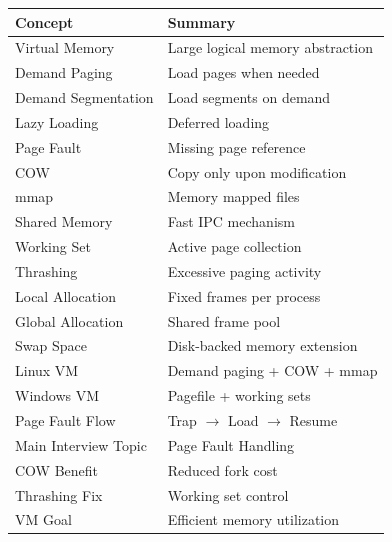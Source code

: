 \begin{longtable}{|p{5cm}|p{8cm}|}
\hline
Concept & Summary \\
\hline
Virtual Memory & Large logical memory abstraction \\
\hline
Demand Paging & Load pages when needed \\
\hline
Demand Segmentation & Load segments on demand \\
\hline
Lazy Loading & Deferred loading \\
\hline
Page Fault & Missing page reference \\
\hline
COW & Copy only upon modification \\
\hline
mmap & Memory mapped files \\
\hline
Shared Memory & Fast IPC mechanism \\
\hline
Working Set & Active page collection \\
\hline
Thrashing & Excessive paging activity \\
\hline
Local Allocation & Fixed frames per process \\
\hline
Global Allocation & Shared frame pool \\
\hline
Swap Space & Disk-backed memory extension \\
\hline
Linux VM & Demand paging + COW + mmap \\
\hline
Windows VM & Pagefile + working sets \\
\hline
Page Fault Flow & Trap $\rightarrow$ Load $\rightarrow$ Resume \\
\hline
Main Interview Topic & Page Fault Handling \\
\hline
COW Benefit & Reduced fork cost \\
\hline
Thrashing Fix & Working set control \\
\hline
VM Goal & Efficient memory utilization \\
\hline
\end{longtable}